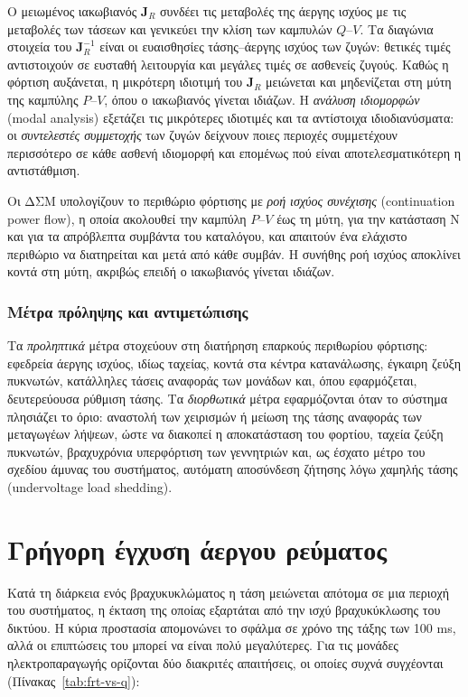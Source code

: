 Ο μειωμένος ιακωβιανός $\mathbf{J}_R$ συνδέει τις μεταβολές της άεργης ισχύος με τις
μεταβολές των τάσεων και γενικεύει την κλίση των καμπυλών $Q$--$V$. Τα διαγώνια στοιχεία του
$\mathbf{J}_R^{-1}$ είναι οι ευαισθησίες τάσης--άεργης ισχύος των ζυγών: θετικές τιμές
αντιστοιχούν σε ευσταθή λειτουργία και μεγάλες τιμές σε ασθενείς ζυγούς. Καθώς η φόρτιση
αυξάνεται, η μικρότερη ιδιοτιμή του $\mathbf{J}_R$ μειώνεται και μηδενίζεται στη μύτη της
καμπύλης $P$--$V$, όπου ο ιακωβιανός γίνεται ιδιάζων. Η \emph{ανάλυση ιδιομορφών} (modal
analysis) εξετάζει τις μικρότερες ιδιοτιμές και τα αντίστοιχα ιδιοδιανύσματα: οι
\emph{συντελεστές συμμετοχής} των ζυγών δείχνουν ποιες περιοχές συμμετέχουν περισσότερο σε
κάθε ασθενή ιδιομορφή και επομένως πού είναι αποτελεσματικότερη η αντιστάθμιση.

Οι ΔΣΜ υπολογίζουν το περιθώριο φόρτισης με \emph{ροή ισχύος συνέχισης} (continuation
power flow), η οποία ακολουθεί την καμπύλη $P$--$V$ έως τη μύτη, για την κατάσταση N και για τα
απρόβλεπτα συμβάντα του καταλόγου, και απαιτούν ένα ελάχιστο περιθώριο να διατηρείται και μετά
από κάθε συμβάν. Η συνήθης ροή ισχύος αποκλίνει κοντά στη μύτη, ακριβώς επειδή ο ιακωβιανός
γίνεται ιδιάζων.

\subsubsection{Μέτρα πρόληψης και αντιμετώπισης}

Τα \emph{προληπτικά} μέτρα στοχεύουν στη διατήρηση επαρκούς περιθωρίου φόρτισης: εφεδρεία
άεργης ισχύος, ιδίως ταχείας, κοντά στα κέντρα κατανάλωσης, έγκαιρη ζεύξη πυκνωτών, κατάλληλες
τάσεις αναφοράς των μονάδων και, όπου εφαρμόζεται, δευτερεύουσα ρύθμιση τάσης. Τα
\emph{διορθωτικά} μέτρα εφαρμόζονται όταν το σύστημα πλησιάζει το όριο: αναστολή των χειρισμών
ή μείωση της τάσης αναφοράς των μεταγωγέων λήψεων, ώστε να διακοπεί η αποκατάσταση του
φορτίου, ταχεία ζεύξη πυκνωτών, βραχυχρόνια υπερφόρτιση των γεννητριών και, ως έσχατο μέτρο του
σχεδίου άμυνας του συστήματος, αυτόματη αποσύνδεση ζήτησης λόγω χαμηλής τάσης (undervoltage
load shedding).

\section{Γρήγορη έγχυση άεργου ρεύματος}
\label{sec:frt}

Κατά τη διάρκεια ενός βραχυκυκλώματος η τάση μειώνεται απότομα σε μια περιοχή του συστήματος,
η έκταση της οποίας εξαρτάται από την ισχύ βραχυκύκλωσης του δικτύου. Η κύρια προστασία
απομονώνει το σφάλμα σε χρόνο της τάξης των 100 ms, αλλά οι επιπτώσεις του μπορεί να είναι
πολύ μεγαλύτερες. Για τις μονάδες ηλεκτροπαραγωγής ορίζονται δύο διακριτές απαιτήσεις, οι
οποίες συχνά συγχέονται (Πίνακας~\ref{tab:frt-vs-q}):

